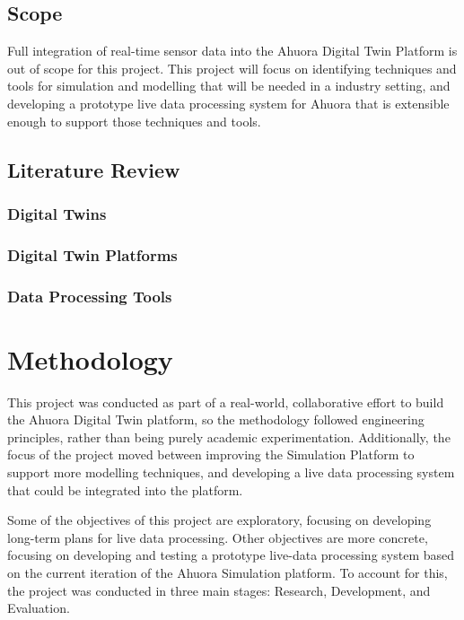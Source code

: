 \documentclass[12pt]{report}
\begin{document}
\section{Scope}

Full integration of real-time sensor data into the Ahuora Digital Twin Platform is out of scope for this project.
This project will focus on identifying techniques and tools for simulation and modelling that will be needed in a industry setting,
and developing a prototype live data processing system for Ahuora that is extensible enough to support those techniques and tools.


\section{Literature Review}


\subsection{Digital Twins}

\subsection{Digital Twin Platforms}

\subsection{Data Processing Tools}


\chapter{Methodology}

This project was conducted as part of a real-world, collaborative effort to build the Ahuora Digital Twin platform, so the methodology followed engineering principles, rather than being purely academic experimentation. Additionally, the focus of the project moved between improving the Simulation Platform to support more modelling techniques, and developing a live data processing system that could be integrated into the platform.

Some of the objectives of this project are exploratory, focusing on developing long-term plans for live data processing. Other objectives are more concrete, focusing on developing and testing a prototype live-data processing system based on the current iteration of the Ahuora Simulation platform. To account for this, the project was conducted in three main stages: Research, Development, and Evaluation.
\end{document}
